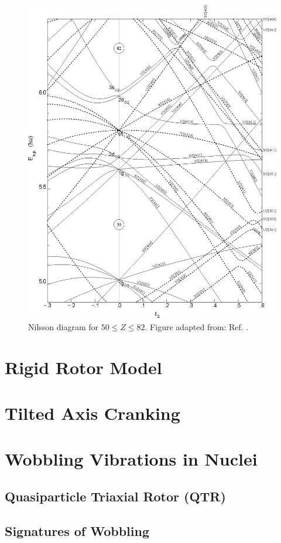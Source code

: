 \begin{figure}[h!]
\label{fig:chp2-nillson}
\centerline{\includegraphics[height=0.9\textheight]{./img/c2/nillson_diagram.eps}}
	\caption{Nilsson diagram for $50\leq Z \leq 82$. Figure adapted from: Ref. \cite{bohrMottelson2}.}
\end{figure}

\section{Rigid Rotor Model}
\label{sec:models-rigid-rotor}

\section{Tilted Axis Cranking}
\label{sec:models-tac}

\section{Wobbling Vibrations in Nuclei}
\label{sec:models-wobbling}
\subsection{Quasiparticle Triaxial Rotor (QTR)}
\label{sec:models-qtr}
\subsection{Signatures of Wobbling}
\label{sec:models-sig}
